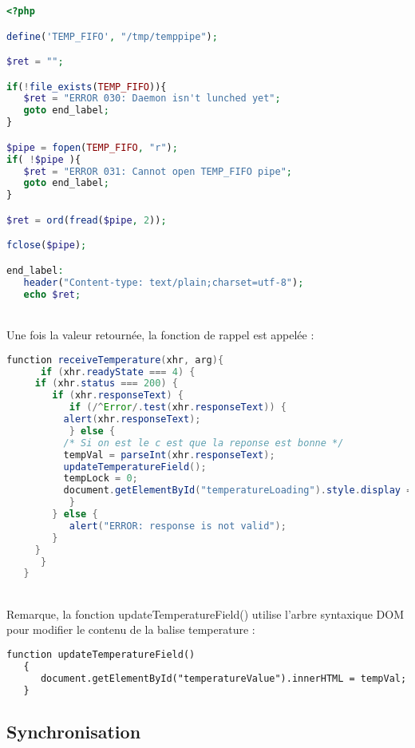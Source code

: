 \begin{DDbox}{\linewidth}
\begin{lstlisting}[language=php]
<?php

define('TEMP_FIFO', "/tmp/temppipe");

$ret = "";

if(!file_exists(TEMP_FIFO)){
   $ret = "ERROR 030: Daemon isn't lunched yet";
   goto end_label;
}

$pipe = fopen(TEMP_FIFO, "r");
if( !$pipe ){
   $ret = "ERROR 031: Cannot open TEMP_FIFO pipe";
   goto end_label;
}

$ret = ord(fread($pipe, 2));

fclose($pipe);

end_label:
   header("Content-type: text/plain;charset=utf-8");
   echo $ret;
\end{lstlisting}
\end{DDbox}
\\
Une fois la valeur retournée, la fonction de rappel est appelée :\\
\begin{DDbox}{\linewidth}
\begin{lstlisting}[language=java]
  function receiveTemperature(xhr, arg){
      if (xhr.readyState === 4) {
	 if (xhr.status === 200) {
	    if (xhr.responseText) {
	       if (/^Error/.test(xhr.responseText)) {
		  alert(xhr.responseText);
	       } else {
		  /* Si on est le c est que la reponse est bonne */
		  tempVal = parseInt(xhr.responseText);
		  updateTemperatureField();
		  tempLock = 0;
		  document.getElementById("temperatureLoading").style.display = "none";
	       }
	    } else {
	       alert("ERROR: response is not valid");
	    }
	 }
      }
   }  
\end{lstlisting}
\end{DDbox}
\\
Remarque, la fonction updateTemperatureField() utilise l'arbre syntaxique DOM pour modifier le contenu de la balise temperature :\\
\begin{DDbox}{\linewidth}
\begin{lstlisting}[language=html]
  function updateTemperatureField()
   {
      document.getElementById("temperatureValue").innerHTML = tempVal;
   }
\end{lstlisting}
\end{DDbox}

\subsection{Synchronisation}

